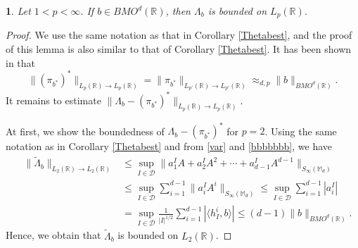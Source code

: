 \documentclass[oneside,english,a4wide]{amsart}
\numberwithin{equation}{section}
\numberwithin{figure}{section}
\theoremstyle{plain}
\theoremstyle{plain}
\theoremstyle{definition}
\theoremstyle{plain}
\newtheorem{lem}[thm]{\protect\lemmaname}
\theoremstyle{remark}
\theoremstyle{definition}
\theoremstyle{remark}
\theoremstyle{definition}
\providecommand{\lemmaname}{Lemma}
\newcommand{\8}{\infty}
\begin{document}
\begin{lem}\label{TLambdab1}
	Let $1<p<\8$. If $b\in BMO^d(\mathbb{R})$, then $\varLambda_b$ is bounded on $L_p(\mathbb{R})$.
\end{lem}
\begin{proof}
	We use the same notation as that in Corollary \ref{Thetabest}, and the proof of this lemma is also similar to that of Corollary \ref{Thetabest}. 
	It has been shown in \cite{CP} that
	\begin{equation}\label{bbbbb}
		\|(\pi_{b^*})^*\|_{L_p(\mathbb{R})\to L_p(\mathbb{R})}=	\|\pi_{b^*}\|_{L_{p'}(\mathbb{R})\to L_{p'}(\mathbb{R})}\approx_{d, p} \|b\|_{BMO^d(\mathbb{R})}.
	\end{equation}
	It remains to estimate $\|\varLambda_b-(\pi_{b^*})^*\|_{L_p(\mathbb{R})\to L_p(\mathbb{R})}$. 
	
	At first, we show the boundedness of $\varLambda_b-(\pi_{b^*})^*$ for $p=2$.
	Using the same notation as in Corollary \ref{Thetabest} and from \eqref{var} and \eqref{bbbbbbb}, we have
	\begin{equation}\label{br}
		\begin{aligned}
			\quad\|\tilde{\varLambda}_b\|_{L_2(\mathbb{R})\to L_2(\mathbb{R})}{}&\le \sup_{I\in\mathcal{D}}\|a_1^IA+a_2^IA^2+\cdots+a_{d-1}^IA^{d-1}\|_{S_\infty(\mathbb{M}_{d})}\\&\le\sup_{I\in\mathcal{D}}\sum_{i=1}^{d-1}\|a_i^IA^i\|_{S_\infty(\mathbb{M}_{d})}\le\sup_{I\in\mathcal{D}}\sum_{i=1}^{d-1}|a_i^I|\\
			&=\sup_{I\in \mathcal{D}}\frac{1}{|I|^{1/2}}\sum_{i=1}^{d-1}|\langle h_I^i,b\rangle|\le (d-1)\|b\|_{BMO^d(\mathbb{R})}.
		\end{aligned}
	\end{equation}
	Hence, we obtain that $\tilde{\varLambda}_b$ is bounded on $L_2(\mathbb{R})$.
	

\end{proof}
\end{document}
